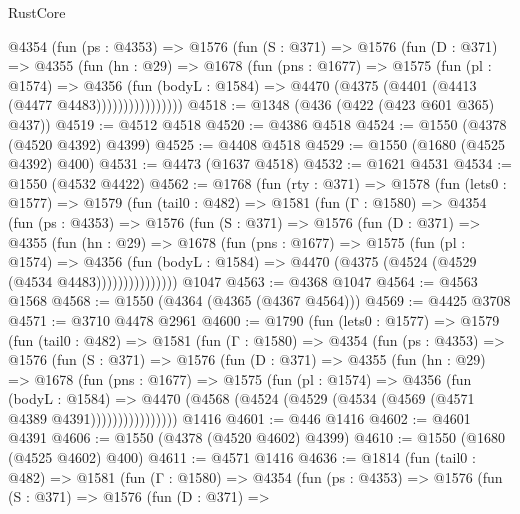 \begin{lexlean}{RustCore}
\begin{coremodule}
            @4354
              (fun (ps : @4353) =>
              @1576
                (fun (S : @371) =>
                @1576
                  (fun (D : @371) =>
                  @4355
                    (fun (hn : @29) =>
                    @1678
                      (fun (pns : @1677) =>
                      @1575
                        (fun (pl : @1574) =>
                        @4356
                          (fun (bodyL : @1584) =>
                          @4470 (@4375 (@4401 (@4413 (@4477 @4483))))))))))))))))
@4518 := @1348 (@436 (@422 (@423 @601 @365) @437))
@4519 := @4512 @4518
@4520 := @4386 @4518
@4524 := @1550 (@4378 (@4520 @4392) @4399)
@4525 := @4408 @4518
@4529 := @1550 (@1680 (@4525 @4392) @400)
@4531 := @4473 (@1637 @4518)
@4532 := @1621 @4531
@4534 := @1550 (@4532 @4422)
@4562 := @1768
    (fun (rty : @371) =>
    @1578
      (fun (lets0 : @1577) =>
      @1579
        (fun (tail0 : @482) =>
        @1581
          (fun (Γ : @1580) =>
          @4354
            (fun (ps : @4353) =>
            @1576
              (fun (S : @371) =>
              @1576
                (fun (D : @371) =>
                @4355
                  (fun (hn : @29) =>
                  @1678
                    (fun (pns : @1677) =>
                    @1575
                      (fun (pl : @1574) =>
                      @4356
                        (fun (bodyL : @1584) =>
                        @4470 (@4375 (@4524 (@4529 (@4534 @4483)))))))))))))))
    @1047
@4563 := @4368 @1047
@4564 := @4563 @1568
@4568 := @1550 (@4364 (@4365 (@4367 @4564)))
@4569 := @4425 @3708
@4571 := @3710 @4478 @2961
@4600 := @1790
    (fun (lets0 : @1577) =>
    @1579
      (fun (tail0 : @482) =>
      @1581
        (fun (Γ : @1580) =>
        @4354
          (fun (ps : @4353) =>
          @1576
            (fun (S : @371) =>
            @1576
              (fun (D : @371) =>
              @4355
                (fun (hn : @29) =>
                @1678
                  (fun (pns : @1677) =>
                  @1575
                    (fun (pl : @1574) =>
                    @4356
                      (fun (bodyL : @1584) =>
                      @4470 (@4568 (@4524 (@4529 (@4534 (@4569 (@4571 @4389 @4391))))))))))))))))
    @1416
@4601 := @446 @1416
@4602 := @4601 @4391
@4606 := @1550 (@4378 (@4520 @4602) @4399)
@4610 := @1550 (@1680 (@4525 @4602) @400)
@4611 := @4571 @1416
@4636 := @1814
    (fun (tail0 : @482) =>
    @1581
      (fun (Γ : @1580) =>
      @4354
        (fun (ps : @4353) =>
        @1576
          (fun (S : @371) =>
          @1576
            (fun (D : @371) =>

\end{coremodule}
\end{lexlean}
